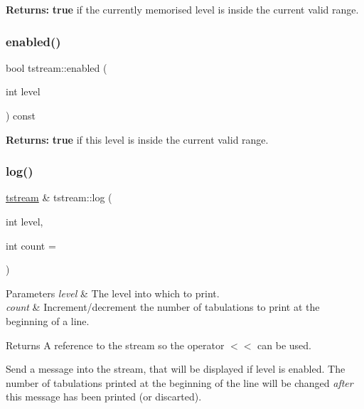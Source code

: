 {\bfseries Returns\+:} {\bfseries true} if the currently memorised level is inside the current valid range. \mbox{\label{clasststream_a3dab6aeefd316ad326a29cec3c2c574b}} 
\subsubsection{\texorpdfstring{enabled()}{enabled()}\hspace{0.1cm}{\footnotesize\ttfamily [2/2]}}
{\footnotesize\ttfamily bool tstream\+::enabled (\begin{DoxyParamCaption}\item[{int}]{level }\end{DoxyParamCaption}) const\hspace{0.3cm}{\ttfamily [inline]}}

{\bfseries Returns\+:} {\bfseries true} if this level is inside the current valid range. \mbox{\label{clasststream_a1fe9745dc492e891a6e765e34fa082c3}} 
\subsubsection{\texorpdfstring{log()}{log()}}
{\footnotesize\ttfamily \mbox{\hyperlink{clasststream}{tstream}} \& tstream\+::log (\begin{DoxyParamCaption}\item[{int}]{level,  }\item[{int}]{count = {} }\end{DoxyParamCaption})\hspace{0.3cm}{\ttfamily [inline]}}


\begin{DoxyParams}{Parameters}
{\em level} & The level into which to print. \\
\hline
{\em count} & Increment/decrement the number of tabulations to print at the beginning of a line. \\
\hline
\end{DoxyParams}
\begin{DoxyReturn}{Returns}
A reference to the stream so the operator {\ttfamily $<$$<$} can be used.
\end{DoxyReturn}
Send a message into the stream, that will be displayed if {\ttfamily level} is enabled. The number of tabulations printed at the beginning of the line will be changed {\itshape after} this message has been printed (or discarted). 

